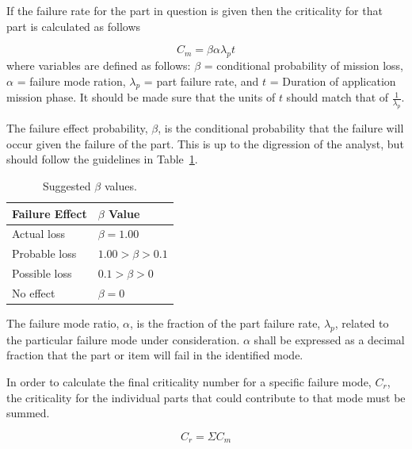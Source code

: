 \documentclass[paper=letter, fontsize=11pt]{scrartcl} %
\numberwithin{equation}{section} %
\numberwithin{figure}{section} %
\numberwithin{table}{section} %
\begin{document}
If the failure rate for the part in question is given then the criticality for that part is calculated as follows

\begin{equation*}
    C_m = \beta \alpha \lambda_p t
\end{equation*}
where variables are defined as follows: $\beta$ = conditional probability of mission loss, $\alpha$ = failure mode ration, $\lambda_p$ = part failure rate, and $t$ = Duration of application mission phase. It should be made sure that the units of $t$ should match that of $\frac{1}{\lambda_p}$.

The failure effect probability, $\beta$, is the conditional probability that the failure will occur given the failure of the part. This is up to the digression of the analyst, but should follow the guidelines in Table~\ref{table:beta}.

\begin{table}[H]
    \begin{centering}
        \begin{tabular}{l l}
            \toprule
            Failure Effect & $\beta$ Value        \\
            \midrule
            Actual loss    & $\beta = 1.00$       \\
            Probable loss  & $1.00 > \beta > 0.1$ \\
            Possible loss  & $0.1 > \beta > 0$    \\
            No effect      & $\beta = 0$          \\
            \bottomrule
        \end{tabular}
        \caption{Suggested $\beta$ values.}
        \label{table:beta}
    \end{centering}
\end{table}

The failure mode ratio, $\alpha$, is the fraction of the part failure rate, $\lambda_p$, related to the particular failure mode under consideration. $\alpha$ shall be expressed as a decimal fraction that the part or item will fail in the identified mode.

In order to calculate the final criticality number for a specific failure mode, $C_r$, the criticality for the individual parts that could contribute to that mode must be summed.

\begin{equation*}
    C_r = \Sigma C_m
\end{equation*}
\end{document}
